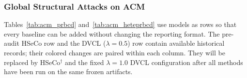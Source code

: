 \subsubsection{Global Structural Attacks on ACM}

Tables~\ref{tab:acm_prbcd} and~\ref{tab:acm_heteprbcd} use models as rows so that every baseline can be added without changing the reporting format. The pre-audit HSeCo row and the DVCL ($\lambda=0.5$) row contain available historical records; their colored changes are paired within each column. They will be replaced by HSeCo$^{\dagger}$ and the fixed $\lambda=1.0$ DVCL configuration after all methods have been run on the same frozen artifacts.

\begin{table}[htbp]
\centering
\small
\caption{Accuracy on ACM under PRBCD. Values currently present are preliminary five-seed records.}
\label{tab:acm_prbcd}
\end{table}

